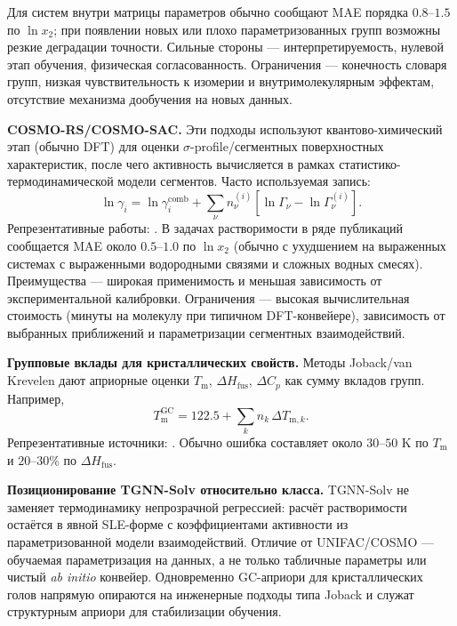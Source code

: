 \documentclass[11pt]{article}
\begin{document}
Для систем внутри матрицы параметров обычно сообщают MAE порядка $0.8$--$1.5$ по $\ln x_2$; при появлении новых или плохо параметризованных групп возможны резкие деградации точности. Сильные стороны --- интерпретируемость, нулевой этап обучения, физическая согласованность. Ограничения --- конечность словаря групп, низкая чувствительность к изомерии и внутримолекулярным эффектам, отсутствие механизма дообучения на новых данных.

\textbf{COSMO-RS/COSMO-SAC.} Эти подходы используют квантово-химический этап (обычно DFT) для оценки $\sigma$-profile/сегментных поверхностных характеристик, после чего активность вычисляется в рамках статистико-термодинамической модели сегментов. Часто используемая запись:
\begin{equation*}
\ln\gamma_i = \ln\gamma_i^{\text{comb}} + \sum_{\nu} n_{\nu}^{(i)}\!\left[\ln\Gamma_{\nu}-\ln\Gamma_{\nu}^{(i)}\right].
\end{equation*}
Репрезентативные работы: \cite{klamt1995,lin2002,klamt2017}. В задачах растворимости в ряде публикаций сообщается MAE около $0.5$--$1.0$ по $\ln x_2$ (обычно с ухудшением на выраженных системах с выраженными водородными связями и сложных водных смесях). Преимущества --- широкая применимость и меньшая зависимость от экспериментальной калибровки. Ограничения --- высокая вычислительная стоимость (минуты на молекулу при типичном DFT-конвейере), зависимость от выбранных приближений и параметризации сегментных взаимодействий.

\textbf{Групповые вклады для кристаллических свойств.} Методы Joback/van Krevelen дают априорные оценки $T_{\mathrm{m}}$, $\Delta H_{\mathrm{fus}}$, $\Delta C_p$ как сумму вкладов групп. Например,
\begin{equation*}
T_{\mathrm{m}}^{\text{GC}} = 122.5 + \sum_k n_k\,\Delta T_{\mathrm{m},k}.
\end{equation*}
Репрезентативные источники: \cite{joback1987,marrero2001}. Обычно ошибка составляет около $30$--$50$ K по $T_{\mathrm{m}}$ и $20$--$30\%$ по $\Delta H_{\mathrm{fus}}$.

\textbf{Позиционирование TGNN-Solv относительно класса.} TGNN-Solv не заменяет термодинамику непрозрачной регрессией: расчёт растворимости остаётся в явной SLE-форме с коэффициентами активности из параметризованной модели взаимодействий. Отличие от UNIFAC/COSMO --- обучаемая параметризация на данных, а не только табличные параметры или чистый \textit{ab initio} конвейер. Одновременно GC-априори для кристаллических голов напрямую опираются на инженерные подходы типа Joback и служат структурным априори для стабилизации обучения.
\end{document}

